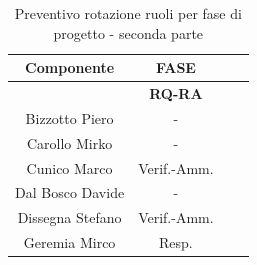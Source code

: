\begin{table}[!h]
	\begin{center}
		  \begin{tabular}
			  {|c|c|c|c|}
			\hline
			\textbf{Componente} & \multicolumn{1}{|c|}{ \textbf{FASE} } \\
			\hline
			& \textbf{RQ-RA} \\
			\hline
			Bizzotto Piero & -   \\
			\hline
			Carollo Mirko & -   \\
			\hline
			Cunico Marco & Verif.-Amm.   \\
			\hline
			Dal Bosco Davide & -   \\
			\hline
			Dissegna Stefano & Verif.-Amm.   \\
			\hline
			Geremia Mirco & Resp.   \\
			\hline

		\end{tabular}
	\caption{Preventivo rotazione ruoli per fase di progetto - seconda parte} %
	\label{tab:TabellaRotazRuoliDue}
	\end{center}	
\end{table}



